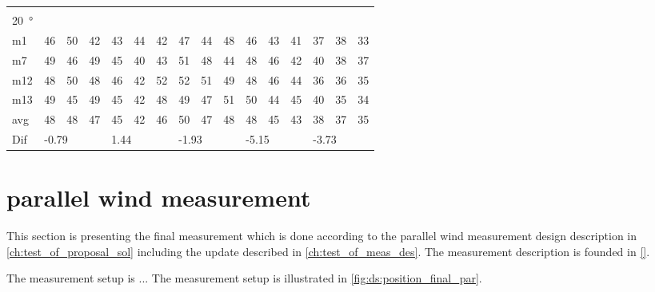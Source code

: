 \begin{table}[H]
\begin{tabular}{l|l|l|l|l|l|l|l|l|l|l|l|l|lll}
 \multicolumn{16}{l}{ } \\                             
\SI{20}{\degree}   & \multicolumn{3}{l|}{} & \multicolumn{3}{l|}{} & \multicolumn{3}{l|}{} & \multicolumn{3}{l|}{} & \multicolumn{3}{l}{}   \\  \hline
m1    &46      &  50    &  42    &   43   &  44    &  42    &  47    &   44    &  48    &    46   &  43    &  41    & \multicolumn{1}{l|}{37} & \multicolumn{1}{l|}{38} &33  \\
m7    & 49     &  46    &  49    &   45   &  40    &   43   &   51   &   48    &  44    &    48   & 46     &  42    & \multicolumn{1}{l|}{40} & \multicolumn{1}{l|}{38} &37  \\
m12  & 48     &  50    &  48    &  46    &  42    &   52   &   52   &   51    &   49   &   48    &  46    & 44     & \multicolumn{1}{l|}{36} & \multicolumn{1}{l|}{36} & 35 \\
m13  &  49    &  45    &  49    &  45    &  42    &   48   &   49   &   47    &  51    &   50    &  44    &  45    & \multicolumn{1}{l|}{40} & \multicolumn{1}{l|}{35} & 34 \\ \hline
avg &  48    & 48     &   47   &  45    & 42     &  46    &  50    &  47     &  48    &  48     &   45   & 43     & \multicolumn{1}{l|}{38} & \multicolumn{1}{l|}{37}  &35  \\ \hline  
Dif & \multicolumn{3}{l|}{-0.79} & \multicolumn{3}{l|}{1.44} & \multicolumn{3}{l|}{-1.93} & \multicolumn{3}{l|}{-5.15} & \multicolumn{3}{l}{-3.73}                                
\end{tabular}
\end{table}

\section{parallel wind measurement}\label{mes:kudo:par_mes}
This section is presenting the final measurement which is done according to the parallel wind measurement design description in \autoref{ch:test_of_proposal_sol} including the update described in \autoref{ch:test_of_meas_des}. The measurement description is founded in \autoref{}. 


The measurement setup is ... The measurement setup is illustrated in \autoref{fig:ds:position_final_par}.







